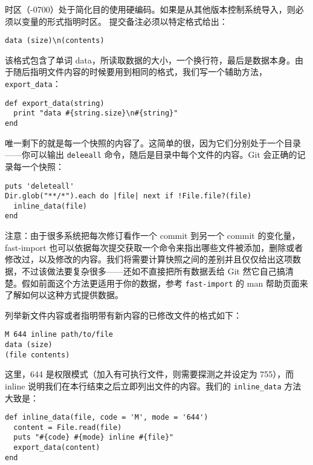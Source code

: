 \documentclass[a4paper]{book}
\begin{document}
时区（-0700）处于简化目的使用硬编码。如果是从其他版本控制系统导入，则必须以变量的形式指明时区。 提交备注必须以特定格式给出：

\begin{shaded}\begin{verbatim}
data (size)\n(contents)
\end{verbatim}\end{shaded}

该格式包含了单词 data，所读取数据的大小，一个换行符，最后是数据本身。由于随后指明文件内容的时候要用到相同的格式，我们写一个辅助方法，\texttt{export\_data}：

\begin{shaded}\begin{verbatim}
def export_data(string)
  print "data #{string.size}\n#{string}"
end
\end{verbatim}\end{shaded}

唯一剩下的就是每一个快照的内容了。这简单的很，因为它们分别处于一个目录------你可以输出 \texttt{deleeall} 命令，随后是目录中每个文件的内容。Git 会正确的记录每一个快照：

\begin{shaded}\begin{verbatim}
puts 'deleteall'
Dir.glob("**/*").each do |file| next if !File.file?(file)
  inline_data(file)
end
\end{verbatim}\end{shaded}

注意：由于很多系统把每次修订看作一个 commit 到另一个 commit 的变化量，fast-import 也可以依据每次提交获取一个命令来指出哪些文件被添加，删除或者修改过，以及修改的内容。我们将需要计算快照之间的差别并且仅仅给出这项数据，不过该做法要复杂很多------还如不直接把所有数据丢给 Git 然它自己搞清楚。假如前面这个方法更适用于你的数据，参考 \texttt{fast-import} 的 man 帮助页面来了解如何以这种方式提供数据。

列举新文件内容或者指明带有新内容的已修改文件的格式如下：

\begin{shaded}\begin{verbatim}
M 644 inline path/to/file
data (size)
(file contents)
\end{verbatim}\end{shaded}

这里，644 是权限模式（加入有可执行文件，则需要探测之并设定为 755），而 inline 说明我们在本行结束之后立即列出文件的内容。我们的 \texttt{inline\_data} 方法大致是：

\begin{shaded}\begin{verbatim}
def inline_data(file, code = 'M', mode = '644')
  content = File.read(file)
  puts "#{code} #{mode} inline #{file}"
  export_data(content)
end
\end{verbatim}\end{shaded}
\end{document}
